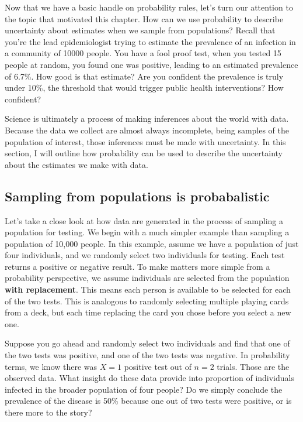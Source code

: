 \documentclass[
]{book}
\begin{document}
Now that we have a basic handle on probability rules, let's turn our attention to the topic that motivated this chapter. How can we use probability to describe uncertainty about estimates when we sample from populations? Recall that you're the lead epidemiologist trying to estimate the prevalence of an infection in a community of 10000 people. You have a fool proof test, when you tested 15 people at random, you found one was positive, leading to an estimated prevalence of 6.7\%. How good is that estimate? Are you confident the prevalence is truly under 10\%, the threshold that would trigger public health interventions? How confident?

Science is ultimately a process of making inferences about the world with data. Because the data we collect are almost always incomplete, being samples of the population of interest, those inferences must be made with uncertainty. In this section, I will outline how probability can be used to describe the uncertainty about the estimates we make with data.

\subsection{Sampling from populations is probabalistic}\label{sampling-from-populations-is-probabalistic}

Let's take a close look at how data are generated in the process of sampling a population for testing. We begin with a much simpler example than sampling a population of 10,000 people. In this example, assume we have a population of just four individuals, and we randomly select two individuals for testing. Each test returns a positive or negative result. To make matters more simple from a probability perspective, we assume individuals are selected from the population \textbf{with replacement}. This means each person is available to be selected for each of the two tests. This is analogous to randomly selecting multiple playing cards from a deck, but each time replacing the card you chose before you select a new one.

Suppose you go ahead and randomly select two individuals and find that one of the two tests was positive, and one of the two tests was negative. In probability terms, we know there was \(X = 1\) positive test out of \(n = 2\) trials. Those are the observed data. What insight do these data provide into proportion of individuals infected in the broader population of four people? Do we simply conclude the prevalence of the disease is 50\% because one out of two tests were positive, or is there more to the story?
\end{document}
